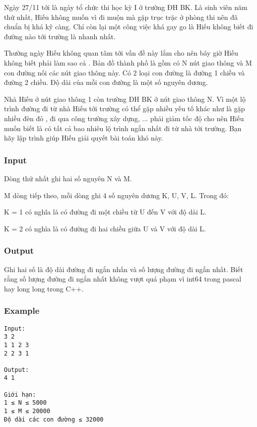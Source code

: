



   Ngày 27/11 tới là ngày tổ chức thi học kỳ I ở trường ĐH BK. Là sinh viên năm thứ nhất, Hiếu không muốn vì đi muộn mà gặp trục trặc ở phòng thi nên đã chuẩn bị khá kỹ càng. Chỉ còn lại một công việc khá gay go là Hiếu không biết đi đường nào tới trường là nhanh nhất.  

   Thường ngày Hiếu không quan tâm tới vấn đề này lắm cho nên bây giờ Hiếu không biết phải làm sao cả . Bản đồ thành phố là gồm có N nút giao thông và M con đường nối các nút giao thông này. Có 2 loại con đường là đường 1 chiều và đường 2 chiều. Độ dài của mỗi con đường là một số nguyên dương.  

   Nhà Hiếu ở nút giao thông 1 còn trường ĐH BK ở nút giao thông N. Vì một lộ trình đường đi từ nhà Hiếu tới trường có thể gặp nhiều yếu tố khác như là gặp nhiều đèn đỏ , đi qua công trường xây dựng, ... phải giảm tốc độ cho nên Hiếu muốn biết là có tất cả bao nhiêu lộ trình ngắn nhất đi từ nhà tới trường. Bạn hãy lập trình giúp Hiếu giải quyết bài toán khó này.  

\subsubsection{   Input  }

   Dòng thứ nhất ghi hai số nguyên N và M.  

   M dòng tiếp theo, mỗi dòng ghi 4 số nguyên dương K, U, V, L. Trong đó:  

   K = 1 có nghĩa là có đường đi một chiều từ U đến V với độ dài L.  

   K = 2 có nghìa là có đường đi hai chiều giữa U và V với độ dài L.  

\subsubsection{   Output  }

   Ghi hai số là độ dài đường đi ngắn nhấn và số lượng đường đi ngắn nhất. Biết rằng số lượng đường đi ngắn nhất không vượt quá phạm vì int64 trong pascal  hay long long trong C++.  

\subsubsection{   Example  }
\begin{verbatim}
Input:
3 2
1 1 2 3
2 2 3 1

Output:
4 1

Giới hạn:
1 ≤ N ≤ 5000
1 ≤ M ≤ 20000
Độ dài các con đường ≤ 32000
\end{verbatim}